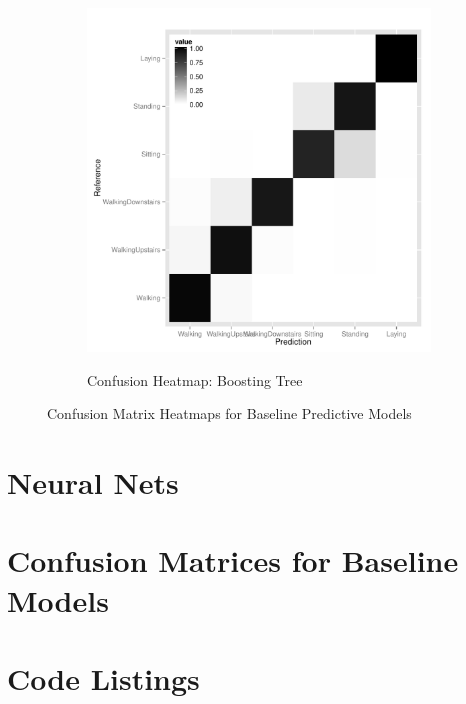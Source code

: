 \begin{landscape}
\begin{figure}
\begin{subfigure}[b]{0.45\textwidth}
    \label{fig:heatmap_rf}
  \end{subfigure}
  \hfill
    \begin{subfigure}[b]{0.45\textwidth}
    \caption{Confusion Heatmap: Boosting Tree}
    \includegraphics[width=\textwidth]{heatmap_boost.pdf}
    \label{fig:heatmap_boost}
  \end{subfigure}
  \caption{Confusion Matrix Heatmaps for Baseline Predictive Models}
\end{figure}
\end{landscape}


\section{Neural Nets} \label{nnets}




\clearpage
\begin{appendices}

\section{Confusion Matrices for Baseline Models}








\section{Code Listings}


\end{appendices}



